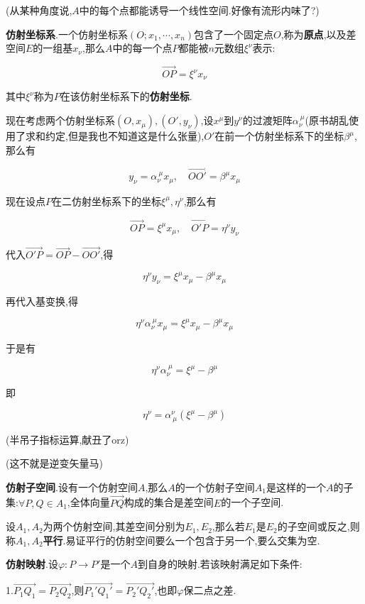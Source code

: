 \documentclass[UTF8]{article}
\begin{document}
	(从某种角度说,$A$中的每个点都能诱导一个线性空间.好像有流形内味了?)
	
	\textbf{仿射坐标系}.一个仿射坐标系$(O;x_1,\cdots,x_n)$包含了一个固定点$O$,称为\textbf{原点},以及差空间$E$的一组基$x_\nu$,那么$A$中的每一个点$P$都能被$n$元数组$\xi^\nu$表示:
	
	\[\overrightarrow{OP}=\xi^\nu x_\nu\]
	
	其中$\xi^\nu$称为$P$在该仿射坐标系下的\textbf{仿射坐标}.
	
	现在考虑两个仿射坐标系$(O,x_\mu),(O',y_\nu)$,设$x^\mu$到$y^\nu$的过渡矩阵$\alpha_{\nu}^{~\mu}$(原书胡乱使用了求和约定,但是我也不知道这是什么张量),$O'$在前一个仿射坐标系下的坐标$\beta^\mu$,那么有
	
	\[y_\nu=\alpha_{\nu}^{~\mu}x_\mu,\quad\overrightarrow{OO'}=\beta^{\mu}x_{\mu}\]
	
	现在设点$P$在二仿射坐标系下的坐标$\xi^\mu,\eta^\nu$,那么有
	
	\[\overrightarrow{OP}=\xi^{\mu}x_{\mu},\quad\overrightarrow{O'P}=\eta^{\nu}y_{\nu}\]
	
	代入$\overrightarrow{O'P}=\overrightarrow{OP}-\overrightarrow{OO'}$,得
	
	\[\eta^{\nu}y_{\nu}=\xi^{\mu}x_{\mu}-\beta^{\mu}x_{\mu}\]
	
	再代入基变换,得
	
	\[\eta^{\nu}\alpha_{\nu}^{~\mu}x_\mu=\xi^{\mu}x_{\mu}-\beta^{\mu}x_{\mu}\]
	
	于是有
	
	\[\eta^{\nu}\alpha_{\nu}^{~\mu}=\xi^{\mu}-\beta^{\mu}\]
	
	即
	
	\[\eta^{\nu}=\alpha^{\nu}_{~\mu}(\xi^{\mu}-\beta^{\mu})\]
	
	(半吊子指标运算,献丑了orz)
	
	(这不就是逆变矢量马)
	
	\textbf{仿射子空间}.设有一个仿射空间$A$,那么$A$的一个仿射子空间$A_1$是这样的一个$A$的子集:$\forall P,Q\in A_1$,全体向量$\overrightarrow{PQ}$构成的集合是差空间$E$的一个子空间.
	
	设$A_1,A_2$为两个仿射空间,其差空间分别为$E_1,E_2$,那么若$E_1$是$E_2$的子空间或反之,则称$A_1,A_2$\textbf{平行}.易证平行的仿射空间要么一个包含于另一个,要么交集为空.
	
	\textbf{仿射映射}.设$\varphi: P \rightarrow P'$是一个$A$到自身的映射.若该映射满足如下条件:
	
	1.$\overrightarrow{P_{1}Q_{1}} = \overrightarrow{P_{2}Q_{2}}$,则$\overrightarrow{P_{1}'Q_{1}'} = \overrightarrow{P_{2}'Q_{2}'}$,也即$\varphi$保二点之差.
	
\end{document}
